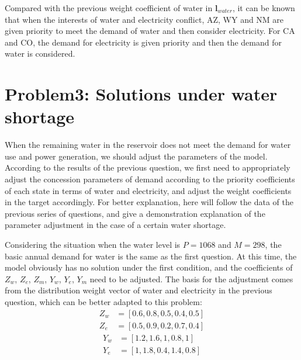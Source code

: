 \documentclass{mcmthesis}
\begin{document}
Compared with the previous weight coefficient of water in $\boldsymbol{l}_{water}$, it can be known that when the interests of water and electricity conflict, AZ, WY and NM are given priority to meet the demand of water and then consider electricity. For CA and CO, the demand for electricity is given priority and then the demand for water is considered.

\section{Problem3: Solutions under water shortage}
When the remaining water in the reservoir does not meet the demand for water use and power generation, we should adjust the parameters of the model. According to the results of the previous question, we first need to appropriately adjust the concession parameters of demand according to the priority coefficients of each state in terms of water and electricity, and adjust the weight coefficients in the target accordingly. For better explanation, here will follow the data of the previous series of questions, and give a demonstration explanation of the parameter adjustment in the case of a certain water shortage.

Considering the situation when the water level is $P=1068$ and $M=298$, the basic annual demand for water is the same as the first question. At this time, the model obviously has no solution under the first condition, and the coefficients of $Z_w$, $Z_e$, $Z_m$, $Y_w$, $Y_e$, $Y_m$ need to be adjusted. The basis for the adjustment comes from the distribution weight vector of water and electricity in the previous question, which can be better adapted to this problem: 
\begin{equation}
	\begin{aligned}
		Z_w&=[0.6,0.8,0.5,0.4,0.5]\\
		Z_e&=[0.5,0.9,0.2,0.7,0.4]
	\end{aligned}
\end{equation}
\begin{equation}
	\begin{aligned}
		Y_w&=[1.2,1.6,1,0.8,1]\\
		Y_e&=[1,1.8,0.4,1.4,0.8]
	\end{aligned}
\end{equation}
\end{document}
